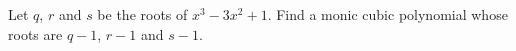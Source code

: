 Let $q$, $r$ and $s$ be the roots of $x^3-3x^2+1$. Find a monic cubic polynomial whose roots are $q-1$, $r-1$ and $s-1$.

